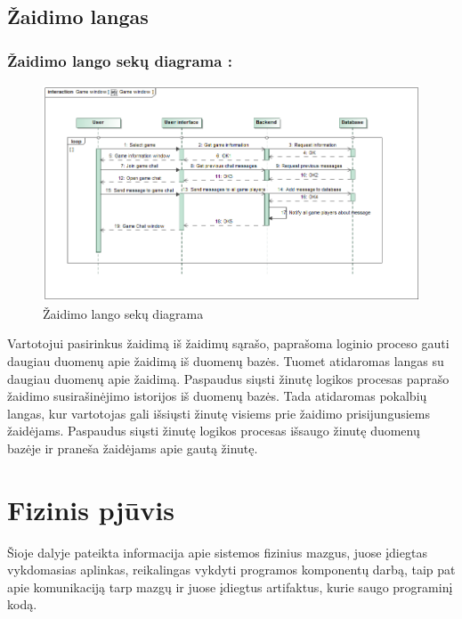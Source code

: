 \documentclass{VUMIFPSkursinis}
\begin{document}
	\subsection{Žaidimo langas}		
		\subsubsection*{Žaidimo lango sekų diagrama :}
			\begin{figure}[H]
				\centering
				\includegraphics[scale=0.5]{img/GameWindow_sequence}
				\caption{Žaidimo lango sekų diagrama}
				\label{img:GameWindow_sequence}
			\end{figure}
			Vartotojui pasirinkus žaidimą iš žaidimų sąrašo, paprašoma loginio proceso
			gauti daugiau duomenų apie žaidimą iš duomenų bazės. Tuomet atidaromas 
			langas su daugiau duomenų apie žaidimą. Paspaudus siųsti žinutę logikos 
			procesas paprašo žaidimo susirašinėjimo istorijos iš duomenų bazės. Tada
			atidaromas pokalbių langas, kur vartotojas gali išsiųsti žinutę visiems 
			prie žaidimo prisijungusiems žaidėjams. Paspaudus siųsti žinutę logikos 
			procesas išsaugo žinutę duomenų bazėje ir praneša žaidėjams apie gautą žinutę.
			\section{Fizinis pjūvis}
Šioje dalyje pateikta informacija apie sistemos fizinius mazgus, juose įdiegtas vykdomasias aplinkas, reikalingas vykdyti programos komponentų darbą, taip pat apie komunikaciją tarp mazgų ir juose įdiegtus artifaktus, kurie saugo programinį kodą.
\end{document}

